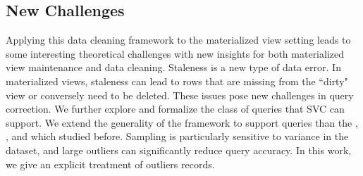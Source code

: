 \subsection{New Challenges}
Applying this data cleaning framework to the materialized view setting leads to some interesting theoretical challenges with new insights for both materialized view maintenance and data cleaning.
Staleness is a new type of data error.
In materialized views, staleness can lead to rows that are missing from the ``dirty" view or conversely need to be deleted. These issues pose new challenges in  query correction. 
We further explore and formalize the class of queries that SVC can support.
We extend the generality of the framework to support queries than the \sumfunc, \avgfunc, and \countfunc which studied before.
Sampling is particularly sensitive to variance in the dataset, and large outliers can significantly reduce query accuracy.
In this work, we give an explicit treatment of outliers records. 




